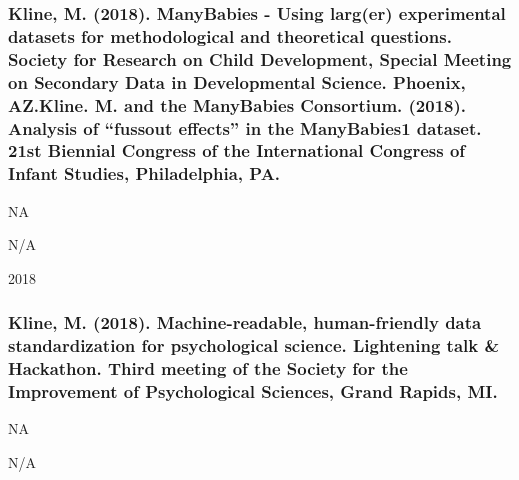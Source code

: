 \documentclass[
]{article}
\begin{document}
\hypertarget{kline-m.-2018.-manybabies---using-larger-experimental-datasets-for-methodological-and-theoretical-questions.-society-for-research-on-child-development-special-meeting-on-secondary-data-in-developmental-science.-phoenix-az.kline.-m.-and-the-manybabies-consortium.-2018.-analysis-of-fussout-effects-in-the-manybabies1-dataset.-21st-biennial-congress-of-the-international-congress-of-infant-studies-philadelphia-pa.}{%
\subsubsection{Kline, M. (2018). ManyBabies - Using larg(er)
experimental datasets for methodological and theoretical questions.
Society for Research on Child Development, Special Meeting on Secondary
Data in Developmental Science. Phoenix, AZ.Kline. M. and the ManyBabies
Consortium. (2018). Analysis of ``fussout effects'' in the ManyBabies1
dataset. 21st Biennial Congress of the International Congress of Infant
Studies, Philadelphia,
PA.}\label{kline-m.-2018.-manybabies---using-larger-experimental-datasets-for-methodological-and-theoretical-questions.-society-for-research-on-child-development-special-meeting-on-secondary-data-in-developmental-science.-phoenix-az.kline.-m.-and-the-manybabies-consortium.-2018.-analysis-of-fussout-effects-in-the-manybabies1-dataset.-21st-biennial-congress-of-the-international-congress-of-infant-studies-philadelphia-pa.}}

NA

N/A

2018

\hypertarget{kline-m.-2018.-machine-readable-human-friendly-data-standardization-for-psychological-science.-lightening-talk-hackathon.-third-meeting-of-the-society-for-the-improvement-of-psychological-sciences-grand-rapids-mi.}{%
\subsubsection{Kline, M. (2018). Machine-readable, human-friendly data
standardization for psychological science. Lightening talk \& Hackathon.
Third meeting of the Society for the Improvement of Psychological
Sciences, Grand Rapids,
MI.}\label{kline-m.-2018.-machine-readable-human-friendly-data-standardization-for-psychological-science.-lightening-talk-hackathon.-third-meeting-of-the-society-for-the-improvement-of-psychological-sciences-grand-rapids-mi.}}

NA

N/A
\end{document}
